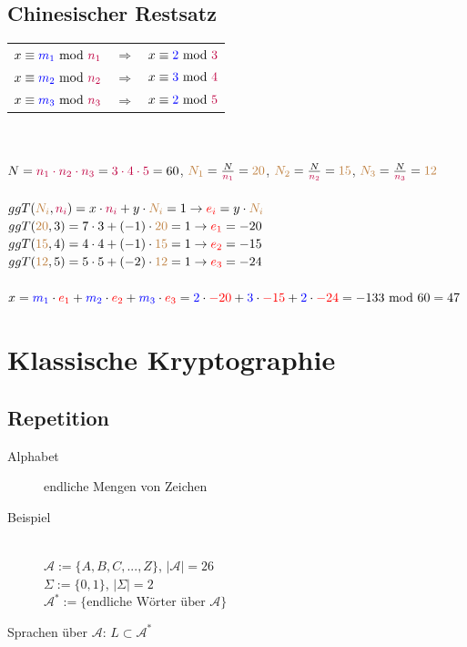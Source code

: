 \documentclass[10pt]{article}
\newcommand{\Pota}{\mathcal{A}}
\newcommand{\T}[1]{\text{#1}} %
\newcommand{\Ra}{\Rightarrow}
\begin{document}
\subsection{Chinesischer Restsatz}
\begin{tabular}{l c l}
 $x\equiv {\color{blue}m_1}\T{ mod }{\color{purple}n_1}$ & $\Ra$ & $x\equiv {\color{blue}2}\T{ mod }{\color{purple}3}$\\
 $x\equiv {\color{blue}m_2}\T{ mod }{\color{purple}n_2}$ & $\Ra$ & $x\equiv {\color{blue}3}\T{ mod }{\color{purple}4}$\\
 $x\equiv {\color{blue}m_3}\T{ mod }{\color{purple}n_3}$ & $\Ra$ & $x\equiv {\color{blue}2}\T{ mod }{\color{purple}5}$\\
\end{tabular}\\ \\
$N={\color{purple}n_1\cdot n_2 \cdot n_3} = {\color{purple}3\cdot4\cdot5}=60$, 
${\color{brown}N_1}=\frac{N}{\color{purple}n_1}={\color{brown}20}$, ${\color{brown}N_2}=\frac{N}{\color{purple}n_2}={\color{brown}15}$, ${\color{brown}N_3}=\frac{N}{\color{purple}n_3}={\color{brown}12}$\\
\\
$ggT({\color{brown}N_i},{\color{purple}n_i})=x\cdot {\color{purple}n_i}+y\cdot {\color{brown}N_i} = 1 \to {\color{red}e_i}=y\cdot {\color{brown}N_i}$ \\
$ggT({\color{brown}20},3)=7\cdot3+(-1)\cdot{\color{brown}20} = 1 \to {\color{red}e_1}=-20$\\
$ggT({\color{brown}15},4)=4\cdot4+(-1)\cdot{\color{brown}15} = 1 \to {\color{red}e_2}=-15$\\
$ggT({\color{brown}12},5)=5\cdot5+(-2)\cdot{\color{brown}12} = 1 \to {\color{red}e_3}=-24$\\
 \\
 $x={\color{blue}m_1}\cdot {\color{red}e_1}+{\color{blue}m_2}\cdot {\color{red}e_2}+{\color{blue}m_3}\cdot {\color{red}e_3}={\color{blue}2}\cdot {\color{red}-20}+{\color{blue}3}\cdot {\color{red}-15}+{\color{blue}2}\cdot {\color{red}-24}=-133\T{ mod }60=47$ 

\newpage
\section{Klassische Kryptographie}
\setcounter{subsection}{-1}
\subsection{Repetition}
\begin{description}
	\item[Alphabet] endliche Mengen von Zeichen
	\item[Beispiel] \hfill \\
		$\Pota := \{A,B,C, ..., Z\}$, $|\Pota|=26$ \\
		$\Sigma := \{0,1\}$, $|\Sigma|=2$\\
		$\Pota ^*:=\{\T{endliche Wörter über }\Pota\}$
\end{description}
Sprachen über $\Pota$: $L\subset\Pota ^*$
\end{document}
